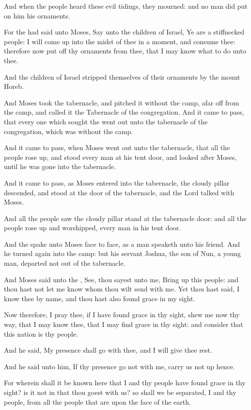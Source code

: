 \verse And when the people heard these evil tidings, they mourned: and no man did put on him his ornaments.

\verse For the \LORD had said unto Moses, Say unto the children of Israel, Ye are a stiffnecked people: I will come up into the midst of thee in a moment, and consume thee: therefore now put off thy ornaments from thee, that I may know what to do unto thee.

\verse And the children of Israel stripped themselves of their ornaments by the mount Horeb.

\verse And Moses took the tabernacle, and pitched it without the camp, afar off from the camp, and called it the Tabernacle of the congregation. And it came to pass, that every one which sought the \LORD went out unto the tabernacle of the congregation, which was without the camp.

\verse And it came to pass, when Moses went out unto the tabernacle, that all the people rose up, and stood every man at his tent door, and looked after Moses, until he was gone into the tabernacle.

\verse And it came to pass, as Moses entered into the tabernacle, the cloudy pillar descended, and stood at the door of the tabernacle, and the Lord talked with Moses.

\verse And all the people saw the cloudy pillar stand at the tabernacle door: and all the people rose up and worshipped, every man in his tent door.

\verse And the \LORD spake unto Moses face to face, as a man speaketh unto his friend. And he turned again into the camp: but his servant Joshua, the son of Nun, a young man, departed not out of the tabernacle.

\verse And Moses said unto the \LORD, See, thou sayest unto me, Bring up this people: and thou hast not let me know whom thou wilt send with me. Yet thou hast said, I know thee by name, and thou hast also found grace in my sight.

\verse Now therefore, I pray thee, if I have found grace in thy sight, shew me now thy way, that I may know thee, that I may find grace in thy sight: and consider that this nation is thy people.

\verse And he said, My presence shall go with thee, and I will give thee rest.

\verse And he said unto him, If thy presence go not with me, carry us not up hence.

\verse For wherein shall it be known here that I and thy people have found grace in thy sight? is it not in that thou goest with us? so shall we be separated, I and thy people, from all the people that are upon the face of the earth.

